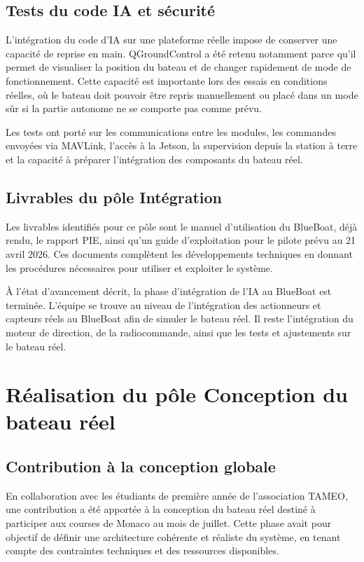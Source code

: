 \documentclass[11pt,letterpaper]{article}
\begin{document}
\subsection{Tests du code IA et sécurité}

L'intégration du code d'IA sur une plateforme réelle impose de conserver une capacité de reprise en main. QGroundControl a été retenu notamment parce qu'il permet de visualiser la position du bateau et de changer rapidement de mode de fonctionnement. Cette capacité est importante lors des essais en conditions réelles, où le bateau doit pouvoir être repris manuellement ou placé dans un mode sûr si la partie autonome ne se comporte pas comme prévu.

Les tests ont porté sur les communications entre les modules, les commandes envoyées via MAVLink, l'accès à la Jetson, la supervision depuis la station à terre et la capacité à préparer l'intégration des composants du bateau réel.

\subsection{Livrables du pôle Intégration}

Les livrables identifiés pour ce pôle sont le manuel d'utilisation du BlueBoat, déjà rendu, le rapport PIE, ainsi qu'un guide d'exploitation pour le pilote prévu au 21 avril 2026. Ces documents complètent les développements techniques en donnant les procédures nécessaires pour utiliser et exploiter le système.

À l'état d'avancement décrit, la phase d'intégration de l'IA au BlueBoat est terminée. L'équipe se trouve au niveau de l'intégration des actionneurs et capteurs réels au BlueBoat afin de simuler le bateau réel. Il reste l'intégration du moteur de direction, de la radiocommande, ainsi que les tests et ajustements sur le bateau réel.

\section{Réalisation du pôle Conception du bateau réel}

\subsection{Contribution à la conception globale}

En collaboration avec les étudiants de première année de l'association TAMEO, une contribution a été apportée à la conception du bateau réel destiné à participer aux courses de Monaco au mois de juillet. Cette phase avait pour objectif de définir une architecture cohérente et réaliste du système, en tenant compte des contraintes techniques et des ressources disponibles.
\end{document}
